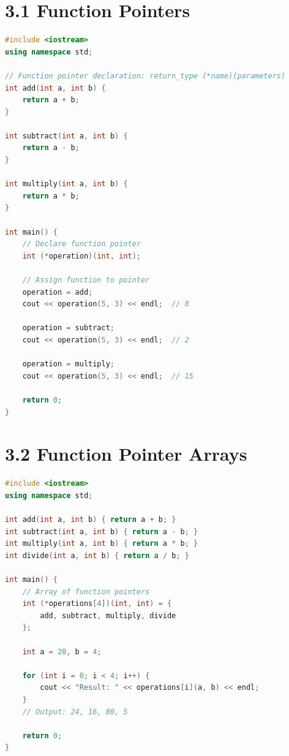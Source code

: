 \hypertarget{function-pointers}{%
\section{3.1 Function Pointers}\label{function-pointers}}

\begin{lstlisting}[language={C++}]
#include <iostream>
using namespace std;

// Function pointer declaration: return_type (*name)(parameters)
int add(int a, int b) {
    return a + b;
}

int subtract(int a, int b) {
    return a - b;
}

int multiply(int a, int b) {
    return a * b;
}

int main() {
    // Declare function pointer
    int (*operation)(int, int);
    
    // Assign function to pointer
    operation = add;
    cout << operation(5, 3) << endl;  // 8
    
    operation = subtract;
    cout << operation(5, 3) << endl;  // 2
    
    operation = multiply;
    cout << operation(5, 3) << endl;  // 15
    
    return 0;
}
\end{lstlisting}

\hypertarget{function-pointer-arrays}{%
\section{3.2 Function Pointer Arrays}\label{function-pointer-arrays}}

\begin{lstlisting}[language={C++}]
#include <iostream>
using namespace std;

int add(int a, int b) { return a + b; }
int subtract(int a, int b) { return a - b; }
int multiply(int a, int b) { return a * b; }
int divide(int a, int b) { return a / b; }

int main() {
    // Array of function pointers
    int (*operations[4])(int, int) = {
        add, subtract, multiply, divide
    };
    
    int a = 20, b = 4;
    
    for (int i = 0; i < 4; i++) {
        cout << "Result: " << operations[i](a, b) << endl;
    }
    // Output: 24, 16, 80, 5
    
    return 0;
}
\end{lstlisting}

